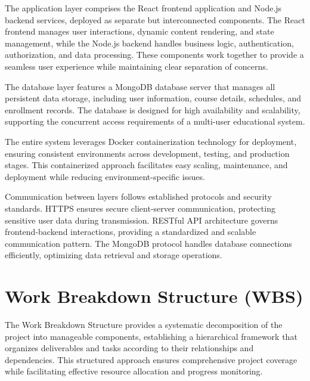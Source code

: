 The application layer comprises the React frontend application and Node.js backend services, deployed as separate but interconnected components. The React frontend manages user interactions, dynamic content rendering, and state management, while the Node.js backend handles business logic, authentication, authorization, and data processing. These components work together to provide a seamless user experience while maintaining clear separation of concerns.

The database layer features a MongoDB database server that manages all persistent data storage, including user information, course details, schedules, and enrollment records. The database is designed for high availability and scalability, supporting the concurrent access requirements of a multi-user educational system.

The entire system leverages Docker containerization technology for deployment, ensuring consistent environments across development, testing, and production stages. This containerized approach facilitates easy scaling, maintenance, and deployment while reducing environment-specific issues.

Communication between layers follows established protocols and security standards. HTTPS ensures secure client-server communication, protecting sensitive user data during transmission. RESTful API architecture governs frontend-backend interactions, providing a standardized and scalable communication pattern. The MongoDB protocol handles database connections efficiently, optimizing data retrieval and storage operations.

\section{Work Breakdown Structure (WBS)}

The Work Breakdown Structure provides a systematic decomposition of the project into manageable components, establishing a hierarchical framework that organizes deliverables and tasks according to their relationships and dependencies. This structured approach ensures comprehensive project coverage while facilitating effective resource allocation and progress monitoring.

